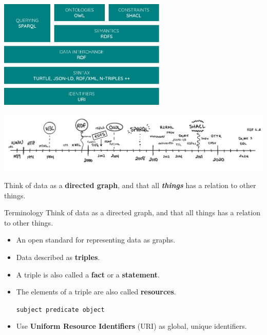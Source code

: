 \documentclass{dt}
\begin{document}
\begin{frame}
\begin{center}
\includegraphics[width=0.6\textwidth]{img/stack-2.png}
\end{center}
\end{frame}

\begin{frame}
\begin{center}
\includegraphics[width=\textwidth]{img/timeline.png}
\end{center}
\end{frame}


\begin{frame}
Think of data as a \textbf{directed graph}, and that all \textbf{\textit{things}} has a relation to other things.
\end{frame}

\begin{frame}{Terminology}
Think of data as a directed graph, and that all things has a relation to other things.

\begin{itemize}
\item An open standard for representing data as graphs.
\begin{center}
\end{center}
\item Data described as \textbf{triples}.
\item A triple is also called a \textbf{fact} or a \textbf{statement}.
\item The elements of a triple are also called \textbf{resources}.
\begin{center}
\texttt{subject predicate object}
\end{center}
\item Use \textbf{Uniform Resource Identifiers} (URI) as global, unique identifiers.
\end{itemize}
\end{frame}
\end{document}
